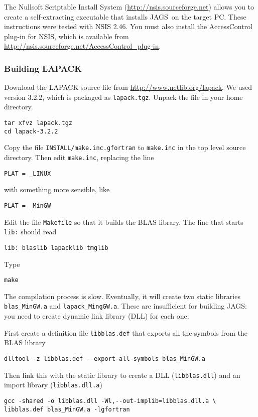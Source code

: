 \documentclass[11pt, a4paper, titlepage]{article}
\newcommand{\JAGS}{\textsf{JAGS}}
\begin{document}
The Nullsoft Scriptable Install System
(\url{http://nsis.sourceforge.net}) allows you to create a
self-extracting executable that installs \JAGS\ on the target PC.
These instructions were tested with NSIS 2.46.  You must also install
the AccessControl plug-in for NSIS, which is available from
\url{http://nsis.sourceforge.net/AccessControl_plug-in}.

\subsubsection{Building LAPACK}

Download the LAPACK source file from
\url{http://www.netlib.org/lapack}. We used version 3.2.2, which is
packaged as \verb+lapack.tgz+. Unpack the file in your home directory.
\begin{verbatim}
tar xfvz lapack.tgz
cd lapack-3.2.2
\end{verbatim}
Copy the file \texttt{INSTALL/make.inc.gfortran} to \texttt{make.inc} in
the top level source directory.  Then edit \texttt{make.inc},
replacing the line
\begin{verbatim}
PLAT = _LINUX
\end{verbatim}
with something more sensible, like
\begin{verbatim}
PLAT = _MinGW
\end{verbatim} 

Edit the file \texttt{Makefile} so that it builds the BLAS library. The
line that starts \texttt{lib:} should read
\begin{verbatim}
lib: blaslib lapacklib tmglib
\end{verbatim}
Type
\begin{verbatim}
make 
\end{verbatim}
The compilation process is slow. Eventually, it will create two static
libraries \verb+blas_MinGW.a+ and \verb+lapack_MingGW.a+. These are
insufficient for building \JAGS: you need to create dynamic link
library (DLL) for each one.

First create a definition file \verb+libblas.def+ that exports all the
symbols from the BLAS library
\begin{verbatim}
dlltool -z libblas.def --export-all-symbols blas_MinGW.a
\end{verbatim}
Then link this with the static library to create a DLL
(\verb+libblas.dll+) and an import library (\verb+libblas.dll.a+)
\begin{verbatim}
gcc -shared -o libblas.dll -Wl,--out-implib=libblas.dll.a \
libblas.def blas_MinGW.a -lgfortran
\end{verbatim}
 
\end{document}
